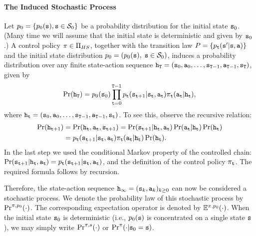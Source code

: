 \paragraph{The Induced Stochastic Process}
Let  ${p_0} = \{ {p_0}({\tt s}),{\tt s} \in {\mathcal{S}_0}\} $ be a
probability distribution for the initial state ${{\tt s}_0}$. (Many
time we will assume that the initial state is deterministic and
given by ${\tt s}_0$.) A control policy $\pi \in {\Pi _{HS}}$,
together with the transition law $P = \{
{p_{\tt t}}({\tt s}'|{\tt s},{\tt a})\} $ and the initial state
distribution ${p_0} = ({p_0}({\tt s}),\;{\tt s} \in {\mathcal{S}_0})$,
induces a probability distribution over any finite state-action
sequence ${{\tt h}_{\tt T}} = ({{\tt s}_0},{{\tt a}_0}, \ldots
,{{\tt s}_{{\tt T} - 1}},{{\tt a}_{{\tt T} -
1}},{{\tt s}_{\tt T}})$, given by
\[\Pr({{\tt h}_{\tt T}}) = {p_0}({{\tt s}_0})\prod\limits_{{\tt t} = 0}^{{\tt T} -1} {p_{\tt t}({{\tt s}_{{\tt t} + 1}}|{{\tt s}_{\tt t}},{{\tt a}_{\tt t}}){\pi _{\tt t}}({{\tt a}_{\tt t}}|{{\tt h}_{\tt t}})} ,\]
where ${{\tt h}_{\tt t}} = ({{\tt s}_0},{{\tt a}_0}, \ldots
,{{\tt s}_{{\tt T} -1}},{{\tt a}_{{\tt T} -1}},{{\tt s}_{\tt t}})$.
%
To see this, observe the recursive relation:
\begin{align*}
\Pr({{\tt h}_{{\tt t} + 1}}) &= \Pr({{\tt h}_{\tt t}},{{\tt a}_{\tt t}},{{\tt s}_{{\tt t} + 1}}) = \Pr({{\tt s}_{{\tt t} + 1}}|{{\tt h}_{\tt t}},{{\tt a}_{\tt t}})\Pr({{\tt a}_{\tt t}}|{{\tt h}_{\tt t}})\Pr({{\tt h}_{\tt t}})\\
 &= {p_{\tt t}}({{\tt s}_{{\tt t} + 1}}|{{\tt s}_{\tt t}},{{\tt a}_{\tt t}}){\pi _{\tt t}}({{\tt a}_{\tt t}}|{{\tt h}_{\tt t}})\Pr({{\tt h}_{\tt t}}).
\end{align*}
In the last step we used the conditional Markov property of the
controlled chain: $\Pr({{\tt s}_{{\tt t} +
1}}|{{\tt h}_{\tt t}},{{\tt a}_{\tt t}}) = {p_{\tt t}}({{\tt s}_{{\tt t}
+ 1}}|{{\tt s}_{\tt t}},{{\tt a}_{\tt t}})$, and the definition of the
control policy $\pi_{\tt t} $. The required formula follows by
recursion.

Therefore, the state-action sequence ${{\tt h}_\infty } =
{({{\tt s}_k},{{\tt a}_k})_{k \ge 0}}$ can now be considered a
stochastic process. We denote the probability law of this stochastic
process by ${\Pr^{\pi ,{p_0}}}( \cdot )$. The corresponding
expectation operator is denoted by ${\mathbb{E}^{\pi ,{p_0}}}( \cdot )$.
When the initial state ${{\tt s}_0}$ is deterministic (i.e.,
${p_0}({\tt s})$ is concentrated on a single state ${\tt s}$), we may
simply write ${\Pr^{\pi ,s}}( \cdot )$  or ${\Pr^\pi }( \cdot
|{{\tt s}_0} = {\tt s})$.

